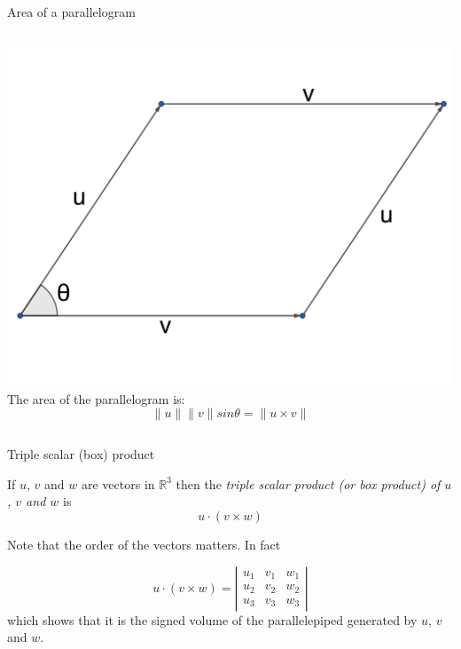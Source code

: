 \documentclass{beamer}
\begin{document}
\begin{frame}{Area of a parallelogram}
\begin{columns}
  \includegraphics{parallelogram.png}
  The area of the parallelogram is:
  \begin{equation*}
  \|u\|\|v\|sin\theta = \|u\times v\|
  \end{equation*}
\end{columns}
\end{frame}

\begin{frame}{Triple scalar (box) product}
\begin{definition}
If $u$, $v$ and $w$ are vectors in $\mathbb{R}^3$ then the \emph{triple scalar product (or box product) of $u$, $v$ and $w$} is
\begin{equation*}
u\cdot (v\times w)
\end{equation*}
\end{definition}
Note that the order of the vectors matters. In fact
\begin{lemma}
\begin{equation*}
u\cdot (v\times w) = \left|
\begin{array}{ccc}
u_1 &v_1 &w_1\\
u_2 &v_2 &w_2\\
u_3&v_3&w_3
\end{array}
\right|
\end{equation*}
which shows that it is the signed volume of the parallelepiped generated by $u$, $v$ and $w$.
\end{lemma}
\end{frame}
\end{document}
